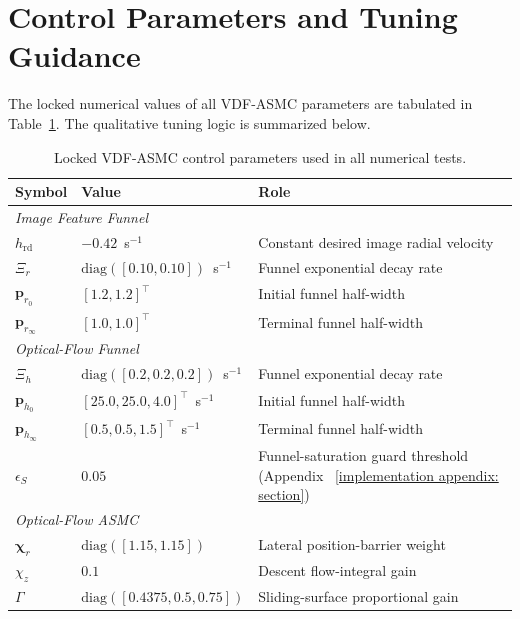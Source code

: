 \documentclass{IEEEtaes}
\begin{document}
\section{Control Parameters and Tuning Guidance} \label{tuning: section}
The locked numerical values of all VDF-ASMC parameters are tabulated in Table~\ref{sup:control params}. The qualitative tuning logic is summarized below.

\begin{table}[!t]
    \centering
    \footnotesize
    \caption{Locked VDF-ASMC control parameters used in all numerical tests.}
    \label{sup:control params}
    \begin{tabular}{p{} p{} p{}}
    \toprule
        \textbf{Symbol} & \textbf{Value} & \textbf{Role}\\
    \midrule
        \multicolumn{3}{l}{\textit{Image Feature Funnel}} \\
        $h_\text{rd}$ & $-0.42$~s$^{-1}$ & Constant desired image radial velocity \\
        $\Xi_r$                     & $\text{diag}([0.10,0.10])$~s$^{-1}$ & Funnel exponential decay rate \\
        $\boldsymbol{p}_{r_0}$      & $[1.2,1.2]^\top$ & Initial funnel half-width \\
        $\boldsymbol{p}_{r_\infty}$ & $[1.0,1.0]^\top$ & Terminal funnel half-width \\
    \midrule
        \multicolumn{3}{l}{\textit{Optical-Flow Funnel}} \\
        $\Xi_h$                     & $\text{diag}([0.2,0.2,0.2])$~s$^{-1}$ & Funnel exponential decay rate \\
        $\boldsymbol{p}_{h_0}$      & $[25.0,25.0,4.0]^\top$~s$^{-1}$ & Initial funnel half-width \\
        $\boldsymbol{p}_{h_\infty}$ & $[0.5,0.5,1.5]^\top$~s$^{-1}$ & Terminal funnel half-width \\
        $\epsilon_S$                & $0.05$ & Funnel-saturation guard threshold (Appendix~
\ref{implementation appendix: section}) \\
    \midrule
        \multicolumn{3}{l}{\textit{Optical-Flow ASMC}} \\
        $\boldsymbol{\chi}_r$   & $\text{diag}([1.15,1.15])$ & Lateral position-barrier weight \\
        $\chi_z$                & $0.1$ & Descent flow-integral gain \\
        $\Gamma$                & $\text{diag}([0.4375,0.5,0.75])$ & Sliding-surface proportional gain \\

\end{tabular}
\end{table}
\end{document}
